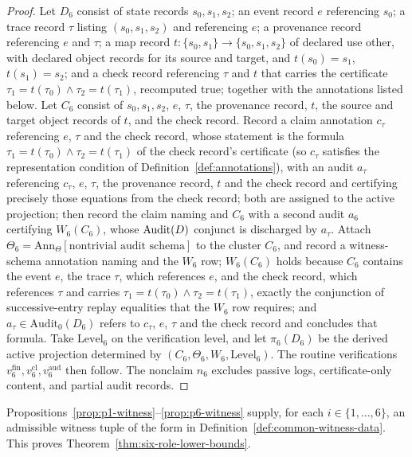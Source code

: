 \begin{proof}
Let \(D_6\) consist of state records \(s_0,s_1,s_2\); an event record \(e\)
referencing \(s_0\); a trace record \(\tau\) listing \((s_0,s_1,s_2)\) and
referencing \(e\); a provenance record referencing \(e\) and \(\tau\); a map
record \(t:\{s_0,s_1\}\to\{s_0,s_1,s_2\}\) of declared use other, with declared
object records for its source and target, and \(t(s_0)=s_1\), \(t(s_1)=s_2\); and a
check record referencing \(\tau\) and \(t\) that carries the certificate
\(\tau_1=t(\tau_0)\wedge\tau_2=t(\tau_1)\), recomputed true; together with the annotations listed below. Let \(C_6\) consist of \(s_0,s_1,s_2\), \(e\), \(\tau\), the provenance record, \(t\), the source and target object records of \(t\), and the check record. Record a claim annotation \(c_\tau\) referencing \(e\), \(\tau\) and the check record, whose statement is the formula \(\tau_1=t(\tau_0)\wedge\tau_2=t(\tau_1)\) of the check record's certificate (so \(c_\tau\) satisfies the representation condition of Definition~\ref{def:annotations}), with an audit \(a_\tau\) referencing
\(c_\tau\), \(e\), \(\tau\), the provenance record, \(t\) and the check record and certifying
precisely those equations from the check record; both are assigned to the
active \Psix{} projection; then record the claim naming \Psix{} and
\(C_6\) with a second audit \(a_6\) certifying \(W_6(C_6)\), whose
\(\operatorname{Audit}\!\left(D\right)\) conjunct is discharged by \(a_\tau\). Attach
\(\Theta_6 = \mathrm{Ann}_\Theta[\text{nontrivial audit schema}]\) to
the cluster \(C_6\), and record a
witness-schema annotation naming \Psix{} and the \(W_6\) row; \(W_6(C_6)\)
holds because \(C_6\) contains the event \(e\), the trace \(\tau\), which
references \(e\), and the check record, which references \(\tau\) and carries
\(\tau_1=t(\tau_0)\wedge\tau_2=t(\tau_1)\), exactly the conjunction of
successive-entry replay equalities that the \(W_6\) row requires; and
\(a_\tau\in\mathrm{Audit}_0(D_6)\) refers to \(c_\tau\), \(e\), \(\tau\) and the check
record and concludes that formula. Take \(\mathrm{Level}_6\) on the verification
level, and let \(\pi_6(D_6)\) be the derived active projection
determined by \((C_6,\Theta_6,W_6,\mathrm{Level}_6)\). The routine
verifications \(v_6^{\mathrm{fin}}, v_6^{\mathrm{cl}},
v_6^{\mathrm{aud}}\) then follow. The nonclaim \(n_6\) excludes passive
logs, certificate-only content, and partial audit records.
\end{proof}

Propositions~\ref{prop:p1-witness}--\ref{prop:p6-witness} supply, for
each \(i \in \{1,\ldots,6\}\), an admissible witness tuple of the
form in Definition~\ref{def:common-witness-data}. This proves
Theorem~\ref{thm:six-role-lower-bounds}.

